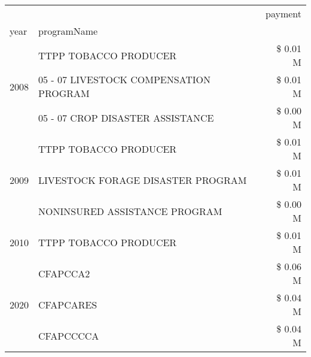 \begin{tabular}{llr}
\toprule
 &  & payment \\
year & programName &  \\
\midrule
\multirow[t]{3}{*}{2008} & TTPP TOBACCO PRODUCER & \$ 0.01 M \\
 & 05 - 07 LIVESTOCK COMPENSATION PROGRAM & \$ 0.01 M \\
 & 05 - 07 CROP DISASTER ASSISTANCE & \$ 0.00 M \\
\cline{1-3}
\multirow[t]{3}{*}{2009} & TTPP TOBACCO PRODUCER & \$ 0.01 M \\
 & LIVESTOCK FORAGE DISASTER  PROGRAM & \$ 0.01 M \\
 & NONINSURED ASSISTANCE PROGRAM & \$ 0.00 M \\
\cline{1-3}
2010 & TTPP TOBACCO PRODUCER & \$ 0.01 M \\
\cline{1-3}
\multirow[t]{3}{*}{2020} & CFAPCCA2 & \$ 0.06 M \\
 & CFAPCARES & \$ 0.04 M \\
 & CFAPCCCCA & \$ 0.04 M \\
\cline{1-3}
\bottomrule
\end{tabular}
